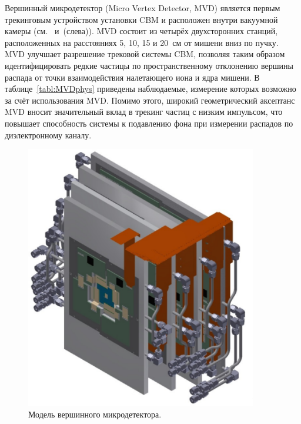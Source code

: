 \begin{minipage}[t]{0.495\textwidth}


Вершинный микродетектор (Micro Vertex Detector, MVD) является первым трекинговым устройством установки CBM и расположен внутри вакуумной камеры (см.~ и~(слева)). MVD состоит из четырёх двухсторонних станций, расположенных на расстояниях 5, 10, 15 и 20~см от мишени вниз по пучку.
MVD улучшает разрешение трековой системы CBM, позволяя таким образом идентифицировать редкие частицы по пространственному отклонению вершины распада от точки взаимодействия налетающего иона и ядра мишени. В таблице~\ref{tabl:MVDphys} приведены наблюдаемые, измерение которых возможно за счёт использования MVD.
Помимо этого, широкий геометрический аксептанс MVD вносит значительный вклад в трекинг частиц с низким импульсом, что повышает способность системы к подавлению фона при измерении распадов по диэлектронному каналу.
\end{minipage}
\begin{minipage}[t]{0.495\textwidth}
\begin{figure}[H]
\includegraphics[width=0.9\textwidth]{pictures/MVD_1.png}
\caption{Модель вершинного микродетектора.}
\label{fig:MVD1}
\end{figure}
\end{minipage}

